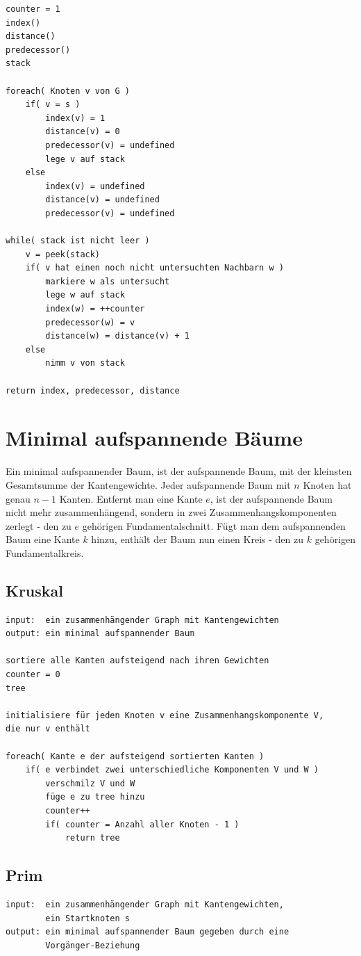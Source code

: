 \documentclass[10pt,a4paper,landscape]{article}
\begin{document}
\begin{multicols*}{2}
\begin{verbatim}
counter = 1
index()
distance()
predecessor()
stack

foreach( Knoten v von G )
    if( v = s )
        index(v) = 1
        distance(v) = 0
        predecessor(v) = undefined
        lege v auf stack
    else
        index(v) = undefined
        distance(v) = undefined
        predecessor(v) = undefined

while( stack ist nicht leer )
    v = peek(stack)
    if( v hat einen noch nicht untersuchten Nachbarn w )
        markiere w als untersucht
        lege w auf stack
        index(w) = ++counter
        predecessor(w) = v
        distance(w) = distance(v) + 1
    else
        nimm v von stack

return index, predecessor, distance
    \end{verbatim}


\section{ Minimal aufspannende Bäume }
    Ein minimal aufspannender Baum, ist der aufspannende Baum, mit der kleinsten Gesamtsumme der Kantengewichte.
    Jeder aufspannende Baum mit $n$ Knoten hat genau $n-1$ Kanten. Entfernt man eine Kante $e$, ist der 
    aufspannende Baum nicht mehr zusammenhängend, sondern in zwei Zusammenhangskomponenten zerlegt - den zu $e$ 
    gehörigen Fundamentalschnitt. Fügt man dem aufspannenden Baum eine Kante $k$ hinzu, enthält der Baum nun 
    einen Kreis - den zu $k$ gehörigen Fundamentalkreis.
    \subsection{ Kruskal }
    \begin{verbatim}
input:  ein zusammenhängender Graph mit Kantengewichten
output: ein minimal aufspannender Baum

sortiere alle Kanten aufsteigend nach ihren Gewichten
counter = 0
tree

initialisiere für jeden Knoten v eine Zusammenhangskomponente V, 
die nur v enthält

foreach( Kante e der aufsteigend sortierten Kanten )
    if( e verbindet zwei unterschiedliche Komponenten V und W )
        verschmilz V und W
        füge e zu tree hinzu
        counter++
        if( counter = Anzahl aller Knoten - 1 )
            return tree
    \end{verbatim}

    \subsection{ Prim }
    \begin{verbatim}
input:  ein zusammenhängender Graph mit Kantengewichten, 
        ein Startknoten s
output: ein minimal aufspannender Baum gegeben durch eine 
        Vorgänger-Beziehung


\end{verbatim}
\end{multicols*}
\end{document}
